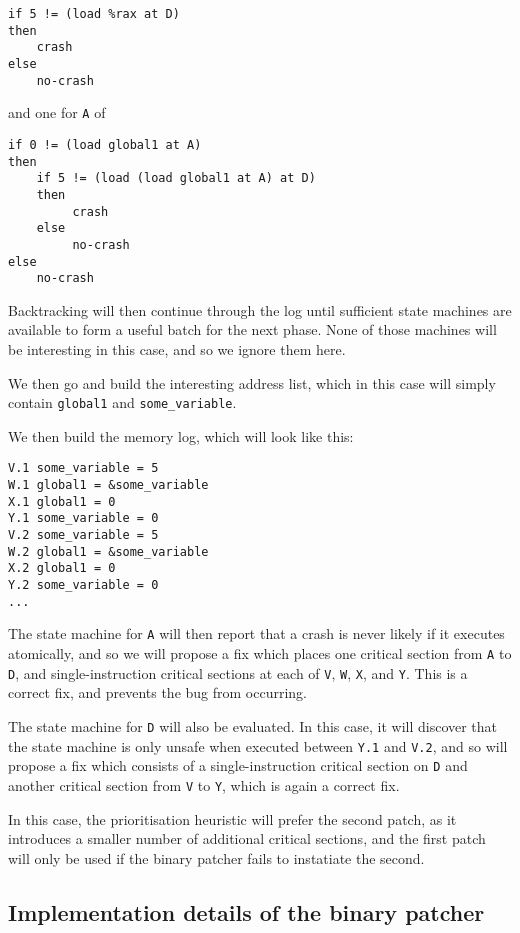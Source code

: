\documentclass[10pt,twocolumn,preprint,natbib,authoryear]{sigplanconf}
\begin{document}
\begin{verbatim}
if 5 != (load %rax at D)
then
    crash
else
    no-crash
\end{verbatim}

and one for \verb|A| of

\begin{verbatim}
if 0 != (load global1 at A)
then
    if 5 != (load (load global1 at A) at D)
    then
         crash
    else
         no-crash
else
    no-crash
\end{verbatim}

Backtracking will then continue through the log until sufficient state
machines are available to form a useful batch for the next phase.
None of those machines will be interesting in this case, and so we
ignore them here.

We then go and build the interesting address list, which in this case
will simply contain \verb|global1| and \verb|some_variable|.

We then build the memory log, which will look like this:

\begin{verbatim}
V.1 some_variable = 5
W.1 global1 = &some_variable
X.1 global1 = 0
Y.1 some_variable = 0
V.2 some_variable = 5
W.2 global1 = &some_variable
X.2 global1 = 0
Y.2 some_variable = 0
...
\end{verbatim}

The state machine for \verb|A| will then report that a crash is never
likely if it executes atomically, and so we will propose a fix which
places one critical section from \verb|A| to \verb|D|, and
single-instruction critical sections at each of \verb|V|, \verb|W|,
\verb|X|, and \verb|Y|.  This is a correct fix, and prevents the bug
from occurring.

The state machine for \verb|D| will also be evaluated.  In this case,
it will discover that the state machine is only unsafe when executed
between \verb|Y.1| and \verb|V.2|, and so will propose a fix which
consists of a single-instruction critical section on \verb|D| and
another critical section from \verb|V| to \verb|Y|, which is again a
correct fix.

In this case, the prioritisation heuristic will prefer the second
patch, as it introduces a smaller number of additional critical
sections, and the first patch will only be used if the binary patcher
fails to instatiate the second.


\subsection{Implementation details of the binary patcher}
\end{document}
